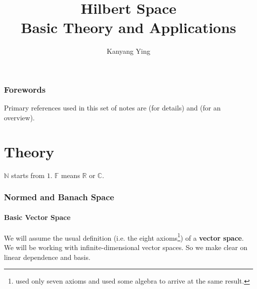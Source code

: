 \documentclass[10pt]{article}
\begin{document}
\title{{Hilbert Space}\\{\normalsize{Basic Theory and Applications}}}
\author{Kanyang Ying}

\maketitle
\newpage

\section{Forewords}
Primary references used in this set of notes are \cite{intro-hilbert} (for details) and \cite{mmnotes} (for an overview).

\newpage

\part{Theory}

$\mathbb{N}$ starts from $1$. $\mathbb{F}$ means $\mathbb{R}$ or $\mathbb{C}$.

\section{Normed and Banach Space}

\subsection{Basic Vector Space}

We will assume the usual definition (i.e. the eight axioms\footnote{\cite[Definition 1.2.1]{intro-hilbert} used only seven axioms and used some algebra to arrive at the same result.}) of a \textbf{vector space}.\\

We will be working with infinite-dimensional vector spaces. So we make clear on linear dependence and basis.

\begin{definition}

\end{definition}

\begin{definition}

\end{definition}

\begin{definition}

\end{definition}
\end{document}
